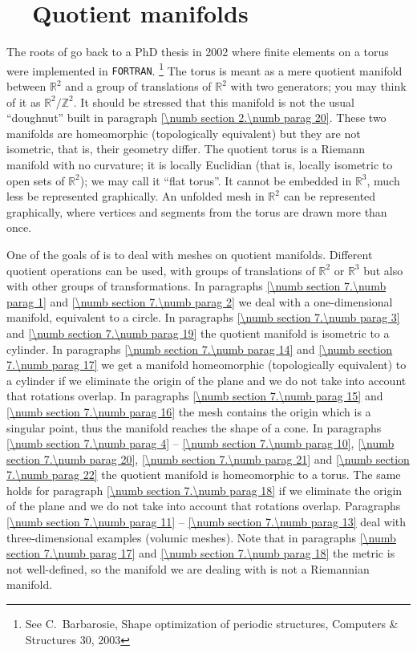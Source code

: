 
\chapter{~~Quotient manifolds}\label{\numb section 7}


The roots of {\maniFEM} go back to a PhD thesis in 2002
where finite elements on a torus were implemented in {\small\tt FORTRAN}.%
\footnote {{} See %
C.~Barbarosie, Shape optimization of periodic structures,
Computers \& Structures 30, 2003}
The torus is meant as a mere quotient manifold between $ \mathbb{R}^2 $ and a group of
translations of $ \mathbb{R}^2 $ with two generators;
you may think of it as $ {\mathbb R}^2/{\mathbb Z}^2 $.
It should be stressed that this manifold is not the usual ``doughnut'' built in paragraph
\ref{\numb section 2.\numb parag 20}.
These two manifolds are homeomorphic (topologically equivalent) but they are not isometric,
that is, their geometry differ.
The quotient torus is a Riemann manifold with no curvature; it is locally Euclidian
(that is, locally isometric to open sets of $ \mathbb{R}^2 $); we may call it ``flat torus''.
It cannot be embedded in $ \mathbb{R}^3 $, much less be represented graphically.
An unfolded mesh in $ \mathbb{R}^2 $ can be represented graphically, where vertices and segments
from the torus are drawn more than once.

One of the goals of {\maniFEM} is to deal with meshes on quotient manifolds.
Different quotient operations can be used, with groups of translations of $ \mathbb{R}^2 $
or $ \mathbb{R}^3 $ but also with other groups of transformations.
In paragraphs \ref{\numb section 7.\numb parag 1} and \ref{\numb section 7.\numb parag 2}
we deal with a one-dimensional manifold, equivalent to a circle.
In paragraphs \ref{\numb section 7.\numb parag 3} and \ref{\numb section 7.\numb parag 19}
the quotient manifold is isometric to a cylinder.
In paragraphs \ref{\numb section 7.\numb parag 14} and \ref{\numb section 7.\numb parag 17}
we get a manifold homeomorphic (topologically equivalent) to a cylinder
if we eliminate the origin of the plane and we do not take into account that
rotations overlap.
In paragraphs \ref{\numb section 7.\numb parag 15} and \ref{\numb section 7.\numb parag 16}
the mesh contains the origin which is a singular point, thus the manifold reaches
the shape of a cone.
In paragraphs \ref{\numb section 7.\numb parag 4} -- \ref{\numb section 7.\numb parag 10},
\ref{\numb section 7.\numb parag 20}, \ref{\numb section 7.\numb parag 21} and
\ref{\numb section 7.\numb parag 22}
the quotient manifold is homeomorphic to a torus.
The same holds for paragraph \ref{\numb section 7.\numb parag 18}
if we eliminate the origin of the plane and we do not take into account that
rotations overlap.
Paragraphs \ref{\numb section 7.\numb parag 11} -- \ref{\numb section 7.\numb parag 13} deal with
three-dimensional examples (volumic meshes).
Note that in paragraphs \ref{\numb section 7.\numb parag 17} and
\ref{\numb section 7.\numb parag 18} the metric is not well-defined,
so the manifold we are dealing with is not a Riemannian manifold.


